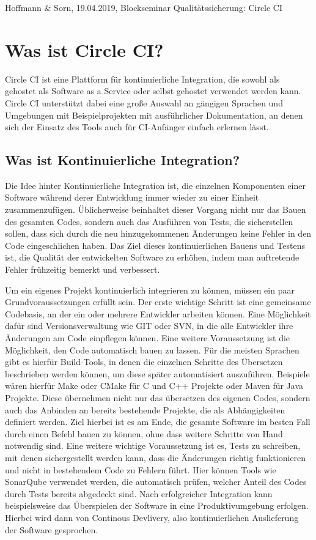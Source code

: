 \documentclass{article}
\begin{document}
Hoffmann \& Sorn, 19.04.2019, Blockseminar Qualitätssicherung: Circle CI

\section {Was ist Circle CI?}

Circle CI ist eine Plattform für kontinuierliche Integration, die sowohl als gehostet als Software as a Service oder selbst gehostet verwendet werden kann. Circle CI unterstützt dabei eine große Auswahl an gängigen Sprachen und Umgebungen mit Beispielprojekten mit ausführlicher Dokumentation, an denen sich der Einsatz des Tools auch für CI-Anfänger einfach erlernen lässt.

\subsection {Was ist Kontinuierliche Integration?}

Die Idee hinter Kontinuierliche Integration ist, die einzelnen Komponenten einer Software während derer Entwicklung immer wieder zu einer Einheit zusammenzufügen. Üblicherweise beinhaltet dieser Vorgang nicht nur das Bauen des gesamten Codes, sondern auch das Ausführen von Tests, die sicherstellen sollen, dass sich durch die neu hinzugekommenen Änderungen keine Fehler in den Code eingeschlichen haben. Das Ziel dieses kontinuierlichen Bauens und Testens ist, die Qualität der entwickelten Software zu erhöhen, indem man auftretende Fehler frühzeitig bemerkt und verbessert.

Um ein eigenes Projekt kontinuierlich integrieren zu können, müssen ein paar Grundvoraussetzungen erfüllt sein. Der erste wichtige Schritt ist eine gemeinsame Codebasis, an der ein oder mehrere Entwickler arbeiten können. Eine Möglichkeit dafür sind Versionsverwaltung wie GIT oder SVN, in die alle Entwickler ihre Änderungen am Code einpflegen können. Eine weitere Voraussetzung ist die Möglichkeit, den Code automatisch bauen zu lassen. Für die meisten Sprachen gibt es hierfür Build-Tools, in denen die einzelnen Schritte des Übersetzen beschrieben werden können, um diese später automatisiert auszuführen. Beispiele wären hierfür Make oder CMake für C und C++ Projekte oder Maven für Java Projekte. Diese übernehmen nicht nur das übersetzen des eigenen Codes, sondern auch das Anbinden an bereits bestehende Projekte, die als Abhängigkeiten definiert werden. Ziel hierbei ist es am Ende, die gesamte Software im besten Fall durch einen Befehl bauen zu können, ohne dass weitere Schritte von Hand notwendig sind.
Eine weitere wichtige Voraussetzung ist es, Tests zu schreiben, mit denen sichergestellt werden kann, dass die Änderungen richtig funktionieren und nicht in bestehendem Code zu Fehlern führt. Hier können Tools wie SonarQube verwendet werden, die automatisch prüfen, welcher Anteil des Codes durch Tests bereits abgedeckt sind. Nach erfolgreicher Integration kann beispielsweise das Überspielen der Software in eine Produktivumgebung erfolgen. Hierbei wird dann von Continous Devlivery, also kontinuierlichen Auslieferung der Software gesprochen.
\end{document}
